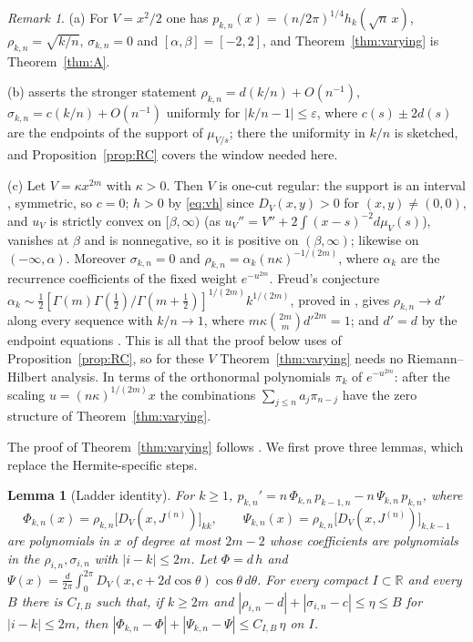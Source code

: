 \documentclass[11pt]{amsart}
\newtheorem{lemma}[theorem]{Lemma}
\theoremstyle{definition}
\theoremstyle{remark}
\newtheorem{remark}[theorem]{Remark}
\numberwithin{equation}{section}
\newcommand{\R}{\mathbb{R}}
\newcommand{\eps}{\varepsilon}
\begin{document}
\begin{remark}\label{rem:RC}
(a) For $V=x^2/2$ one has $p_{k,n}(x)=(n/2\pi)^{1/4}h_k(\sqrt n\,x)$, $\rho_{k,n}=\sqrt{k/n}$, $\sigma_{k,n}=0$ and $[\alpha,\beta]=[-2,2]$, and Theorem~\ref{thm:varying} is Theorem~\ref{thm:A}.

(b) \cite[Proposition~5.1]{BI} asserts the stronger statement $\rho_{k,n}=d(k/n)+O(n^{-1})$, $\sigma_{k,n}=c(k/n)+O(n^{-1})$ uniformly for $|k/n-1|\le\eps$, where $c(s)\pm2d(s)$ are the endpoints of the support of $\mu_{V/s}$; there the uniformity in $k/n$ is sketched, and Proposition~\ref{prop:RC} covers the window needed here.

(c) Let $V=\kappa x^{2m}$ with $\kappa>0$. Then $V$ is one-cut regular: the support is an interval \cite[Theorem~IV.1.10]{SaTo}, symmetric, so $c=0$; $h>0$ by \eqref{eq:vh} since $D_V(x,y)>0$ for $(x,y)\ne(0,0)$, and $u_V$ is strictly convex on $[\beta,\infty)$ (as $u_V''=V''+2\int(x-s)^{-2}d\mu_V(s)$), vanishes at $\beta$ and is nonnegative, so it is positive on $(\beta,\infty)$; likewise on $(-\infty,\alpha)$. Moreover $\sigma_{k,n}=0$ and $\rho_{k,n}=\alpha_k(n\kappa)^{-1/(2m)}$, where $\alpha_k$ are the recurrence coefficients of the fixed weight $e^{-u^{2m}}$. Freud's conjecture $\alpha_k\sim\frac12[\Gamma(m)\Gamma(\frac12)/\Gamma(m+\frac12)]^{1/(2m)}k^{1/(2m)}$, proved in \cite{Ma,LMS}, gives $\rho_{k,n}\to d'$ along every sequence with $k/n\to1$, where $m\kappa\binom{2m}m d'^{2m}=1$; and $d'=d$ by the endpoint equations \cite[(4.13)]{BI}. This is all that the proof below uses of Proposition~\ref{prop:RC}, so for these $V$ Theorem~\ref{thm:varying} needs no Riemann--Hilbert analysis. In terms of the orthonormal polynomials $\pi_k$ of $e^{-u^{2m}}$: after the scaling $u=(n\kappa)^{1/(2m)}x$ the combinations $\sum_{j\le n}a_j\pi_{n-j}$ have the zero structure of Theorem~\ref{thm:varying}.
\end{remark}

The proof of Theorem~\ref{thm:varying} follows \cite[Sections~{\ref{M-sec:prelim}}--{\ref{M-sec:proof}}]{Main}. We first prove three lemmas, which replace the Hermite-specific steps.

\begin{lemma}[Ladder identity]\label{lem:ladder}
For $k\ge1$, $p_{k,n}'=n\,\Phi_{k,n}\,p_{k-1,n}-n\,\Psi_{k,n}\,p_{k,n}$, where
\[
\Phi_{k,n}(x)=\rho_{k,n}\bigl[D_V(x,J^{(n)})\bigr]_{kk},\qquad\Psi_{k,n}(x)=\rho_{k,n}\bigl[D_V(x,J^{(n)})\bigr]_{k,k-1}
\]
are polynomials in $x$ of degree at most $2m-2$ whose coefficients are polynomials in the $\rho_{i,n},\sigma_{i,n}$ with $|i-k|\le2m$. Let $\Phi=d\,h$ and $\Psi(x)=\frac d{2\pi}\int_0^{2\pi}D_V(x,c+2d\cos\theta)\cos\theta\,d\theta$. For every compact $I\subset\R$ and every $B$ there is $C_{I,B}$ such that, if $k\ge2m$ and $|\rho_{i,n}-d|+|\sigma_{i,n}-c|\le\eta\le B$ for $|i-k|\le2m$, then $|\Phi_{k,n}-\Phi|+|\Psi_{k,n}-\Psi|\le C_{I,B}\,\eta$ on $I$.
\end{lemma}
\end{document}
